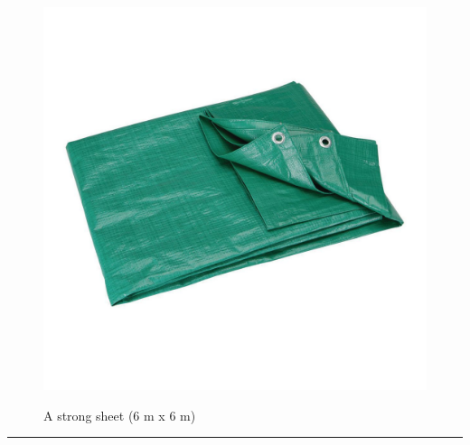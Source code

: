 \documentclass{article}
\begin{document}
    \begin{figure}[H]
        \centering
        \begin{minipage}{0.25\textwidth}
            \centering
            \includegraphics[width=\textwidth]{../SurvivalItemImages/tarp}
        \end{minipage}\hfill
        \begin{minipage}{0.7\textwidth}
            \centering
            \Large A strong sheet (6 m x 6 m)
        \end{minipage}
    \end{figure}
    \vspace{-0.8em}
    \noindent\rule{\textwidth}{0.4pt}
            
\end{document}
